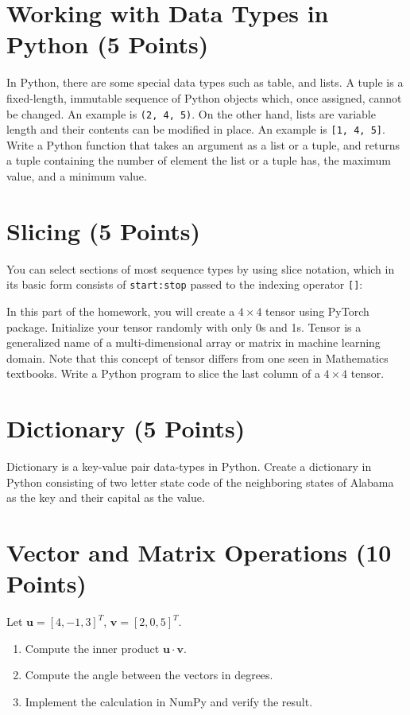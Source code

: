 \documentclass[12pt, xcolor=dvipsnames,svgnames,x11names]{article}
\begin{document}
\section{Working with Data Types in Python (5 Points)}
In Python, there are some special data types such as table, and lists.
A tuple is a fixed-length, immutable sequence of Python objects which, once assigned,
cannot be changed. An example is \texttt{(2, 4, 5)}. On the other hand, lists are variable length and their contents can be modified in place. An example is \texttt{[1, 4, 5]}. Write a Python function that takes an argument as a list or a tuple, and returns a tuple containing the number of element the list or a tuple has, the maximum value, and a minimum value.

\section{Slicing (5 Points)}
   You can select sections of most sequence types by using slice notation, which in its
   basic form consists of \texttt{start:stop} passed to the indexing operator \texttt{[]}:

   In this part of the homework, you will create a $4\times4$ tensor using PyTorch package. Initialize your tensor randomly with only 0s and 1s. Tensor is a generalized name of a multi-dimensional array or matrix in machine learning domain. Note that this concept of tensor differs from one seen in Mathematics textbooks. Write a Python program to slice the last column of a $4\times4$ tensor.


\section{Dictionary (5 Points)}
Dictionary is a key-value pair data-types in Python. Create a dictionary in Python consisting of two letter state code of the neighboring states of Alabama as the key and their capital as the value.

\section{Vector and Matrix Operations (10 Points)}
Let $\mathbf{u} = [4, -1, 3]^T$, $\mathbf{v} = [2, 0, 5]^T$. 
\begin{enumerate}
      \item Compute the inner product $\mathbf{u} \cdot \mathbf{v}$.
      \item Compute the angle between the vectors in degrees.
      \item Implement the calculation in NumPy and verify the result.
\end{enumerate}
\end{document}
